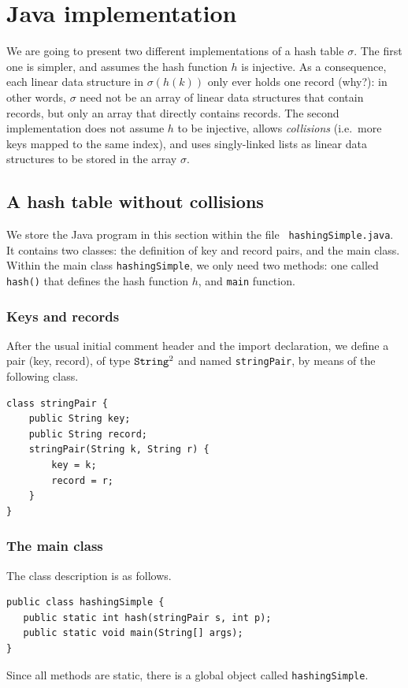 \documentclass[a4paper]{book}
\theoremstyle{changebreak}                %
\begin{document}
\section{Java implementation}
We are going to present two different implementations of a hash
table $\sigma$. The first one is simpler, and
assumes the hash function $h$ is injective. As a consequence, each linear data structure in
$\sigma(h(k))$ only ever holds one record (why?): in other words,
$\sigma$ need not be an array of linear data structures that contain
records, but only an array that directly contains
records. The second implementation does not assume $h$ to be
injective, allows {\it collisions} (i.e.~more keys
mapped to the same index), and uses singly-linked
lists as linear data structures to be stored
in the array $\sigma$.

\subsection{A hash table without collisions}
We store the Java program in this section within the file {\tt
  hashingSimple.java}. It contains two classes: the definition of
key and record pairs, and the main
class. Within the main class {\tt hashingSimple}, we
only need two methods: one called {\tt hash()} that defines the hash
function $h$, and {\tt main} function.

\subsubsection{Keys and records}
\label{s:hash:stringpair}
After the usual initial comment header and the import declaration, we
define a pair (key, record), of type $\mbox{\tt String}^2$ and named
{\tt stringPair}, by means of the following class.
\begin{verbatim}
class stringPair {
    public String key;
    public String record;
    stringPair(String k, String r) {
        key = k;
        record = r;
    }
}
\end{verbatim}

\subsubsection{The main class}
The class description is as follows.
\begin{verbatim}
public class hashingSimple {
   public static int hash(stringPair s, int p);
   public static void main(String[] args);
}
\end{verbatim}
Since all methods are static, there is a global
object called {\tt hashingSimple}.
\end{document}
